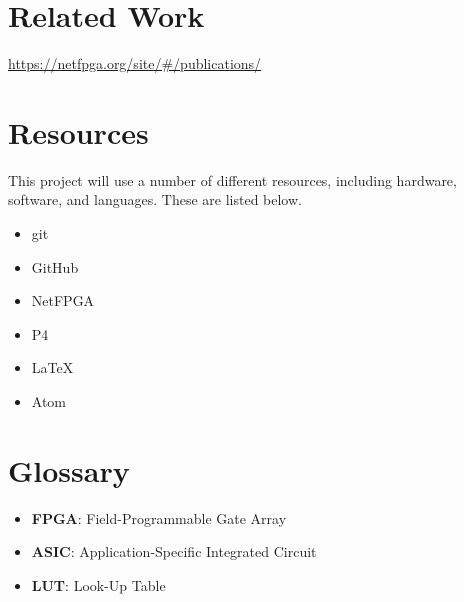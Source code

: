 \documentclass[12pt, a4paper, twoside, onecolumn]{article}
\begin{document}
\section{Related Work}
\label{related_work}
\url{https://netfpga.org/site/#/publications/}

\section{Resources}
\label{resources}
This project will use a number of different resources, including hardware, software, and languages. These are listed below.
\begin{itemize}
  \item git \cite{git}
  \item GitHub \cite{github}
  \item NetFPGA \cite{NetFPGA}
  \item P4 \cite{P4}
  \item LaTeX
  \item Atom
\end{itemize}

\section{Glossary}
\label{glossary}
\begin{itemize}
  \item \textbf{FPGA}: Field-Programmable Gate Array
  \item \textbf{ASIC}: Application-Specific Integrated Circuit
  \item \textbf{LUT}: Look-Up Table
\end{itemize}




\end{document}
